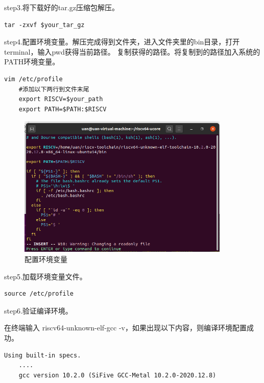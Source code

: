 step3.将下载好的tar.gz压缩包解压。

\begin{lstlisting}[caption={解压命令}, label={lst:tar_command}]
    tar -zxvf $your_tar_gz
\end{lstlisting}

step4.配置环境变量。解压完成得到文件夹，进入文件夹里的bin目录，打开terminal，输入pwd获得当前路径。
复制获得的路径。将复制到的路径加入系统的PATH环境变量。

\begin{lstlisting}[caption={修改环境变量}, label={lst:change_env}]
    vim /etc/profile
    #添加以下两行到文件末尾
    export RISCV=$your_path
    export PATH=$PATH:$RISCV
\end{lstlisting}

\begin{figure}[htbp]
    \vspace{13pt} %
    \centering
    \includegraphics[width=0.9\textwidth]{images/env_path.png}
    \caption{配置环境变量}\label{配置环境变量} %
\end{figure}

step5.加载环境变量文件。

\begin{lstlisting}[caption={加载环境变量文件}, label={lst:load_env_profile}]
    source /etc/profile
\end{lstlisting}

step6.验证编译环境。

在终端输入 riscv64-unknown-elf-gcc -v，如果出现以下内容，则编译环境配置成功。

\begin{lstlisting}[caption={验证编译环境}, label={lst:check_env}]
    Using built-in specs.
    ....
    gcc version 10.2.0 (SiFive GCC-Metal 10.2.0-2020.12.8) 
\end{lstlisting}

